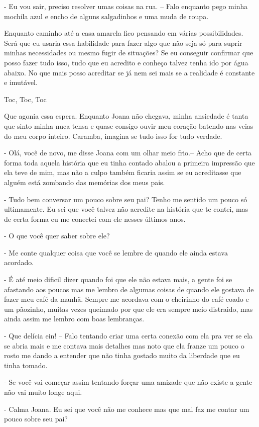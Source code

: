 - Eu vou sair, preciso resolver umas coisas na rua. -- Falo enquanto pego minha mochila azul e encho de alguns salgadinhos e uma muda de roupa.

Enquanto caminho até a casa amarela fico pensando em várias possibilidades. Será que eu usaria essa habilidade para fazer algo que não seja só para suprir minhas necessidades ou mesmo fugir de situações? Se eu conseguir confirmar que posso fazer tudo isso, tudo que eu acredito e conheço talvez tenha ido por água abaixo. No que mais posso acreditar se já nem sei mais se a realidade é constante e imutável.

Toc, Toc, Toc

Que agonia essa espera. Enquanto Joana não chegava, minha ansiedade é tanta que sinto minha nuca tensa e quase consigo ouvir meu coração batendo nas veias do meu corpo inteiro. Caramba, imagina se tudo isso for tudo verdade.

- Olá, você de novo, me disse Joana com um olhar meio frio.-- Acho que de certa forma toda aquela história que eu tinha contado abalou a primeira impressão que ela teve de mim, mas não a culpo também ficaria assim se eu acreditasse que alguém está zombando das memórias dos meus pais.

- Tudo bem conversar um pouco sobre seu pai? Tenho me sentido um pouco só ultimamente. Eu sei que você talvez não acredite na história que te contei, mas de certa forma eu me conectei com ele nesses últimos anos.

- O que você quer saber sobre ele?

- Me conte qualquer coisa que você se lembre de quando ele ainda estava acordado.

- É até meio dificil dizer quando foi que ele não estava mais, a gente foi se afastando aos poucos mas me lembro de algumas coisas de quando ele gostava de fazer meu café da manhã. Sempre me acordava com o cheirinho do café coado e um pãozinho, muitas vezes queimado por que ele era sempre meio distraido, mas ainda assim me lembro com boas lembranças.

- Que delícia ein! -- Falo tentando criar uma certa conexão com ela pra ver se ela se abria mais e me contava mais detalhes mas noto que ela franze um pouco o rosto me dando a entender que não tinha gostado muito da liberdade que eu tinha tomado.

- Se você vai começar assim tentando forçar uma amizade que não existe a gente não vai muito longe aqui.

- Calma Joana. Eu sei que você não me conhece mas que mal faz me contar um pouco sobre seu pai?

